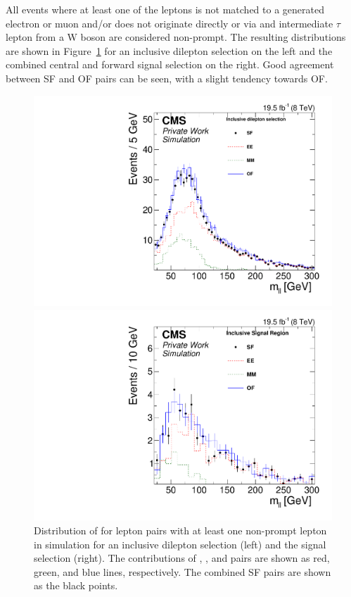 All events where at least one of the leptons is not matched to a generated electron or muon and/or does not originate directly or via and intermediate $\tau$ lepton from a W boson are considered non-prompt. The resulting \mll distributions are shown in Figure~\ref{fig:nonPromptMC} for an inclusive dilepton selection on the left and the combined central and forward signal selection on the right. Good agreement between SF and OF pairs can be seen, with a slight tendency towards OF. 
\begin{figure}[htbp]
\centering
\begin{minipage}[t]{0.49\textwidth}
  \includegraphics[width=\textwidth]{plots/BG/nonPrompt/nonPromptMC_Inclusive_Full2012_Mll_None.pdf}
\end{minipage}
\begin{minipage}[t]{0.49\textwidth}
\includegraphics[width=\textwidth]{plots/BG/nonPrompt/nonPromptMC_SignalInclusive_Full2012_Mll_None.pdf}
\end{minipage}
\caption{Distribution of \mll for lepton pairs with at least one non-prompt lepton in simulation for an inclusive dilepton selection (left) and the signal selection (right). The contributions of \EE, \MM, and \EM pairs are shown as red, green, and blue lines, respectively. The combined SF pairs are shown as the black points.}
\label{fig:nonPromptMC}
\end{figure} 

